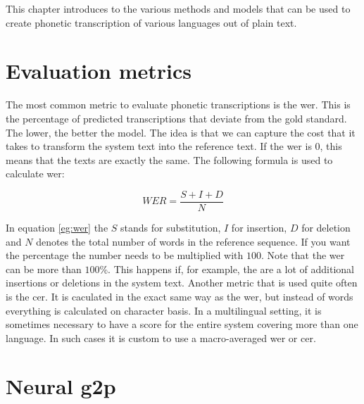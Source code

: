 
\label{chap:3_model}
This chapter introduces to the various methods and models that can be used to create phonetic transcription of various languages out of plain text.


\section{Evaluation metrics}
The most common metric to evaluate phonetic transcriptions is the \ac{wer}. This is the percentage of predicted transcriptions that deviate from the gold standard. The lower, the better the model. The idea is that we can capture the cost that it takes to transform the system text into the reference text. If the \ac{wer} is 0, this means that the texts are exactly the same. The following formula is used to calculate \ac{wer}:    

\begin{equation} 
\label{eq:wer}
WER = \frac{S+I+D}{N}
\end{equation}

In equation \ref{eg:wer} the $S$ stands for substitution, $I$ for insertion, $D$ for deletion and $N$ denotes the total number of words in the reference sequence. If you want the percentage the number needs to be multiplied with $100$. Note that the \ac{wer} can be more than $100$\%. This happens if, for example, the are a lot of additional insertions or deletions in the system text. Another metric that is used quite often is the \ac{cer}. It is caculated in the exact same way as the \ac{wer}, but instead of words everything is calculated on character basis. In a multilingual setting, it is sometimes necessary to have a score for the entire system covering more than one language. In such cases it is custom to use a macro-averaged \ac{wer} or \ac{cer}. 


\section{Neural \ac{g2p}}
 


